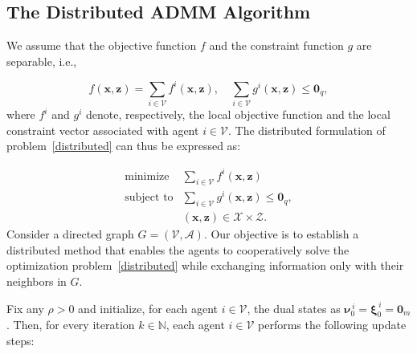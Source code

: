 \documentclass[11pt,a4paper]{article}
\theoremstyle{plain}
\theoremstyle{definition}
\theoremstyle{remark}
\begin{document}
	\subsection{The Distributed ADMM Algorithm}
	
	We assume that the objective function $f $ and the constraint function $g$
	are separable, i.e.,
	
	\begin{equation*}
		f(\boldsymbol{x}, \boldsymbol{z}) = \sum_{i \in \mathcal{V}} f^i(\boldsymbol{x}, \boldsymbol{z}), 
		\quad 
		\sum_{i \in \mathcal{V}} g^i(\boldsymbol{x}, \boldsymbol{z}) \leq \boldsymbol{0}_q,
	\end{equation*}
	where $f^i$ and $g^i$ denote, respectively, the local objective function and the local constraint vector associated with agent $i \in \mathcal{V}$. The distributed formulation of problem~\eqref{distributed} can thus be expressed as:
	
	\begin{equation}
		\begin{array}{ll}
			\text{minimize} & \sum_{i \in \mathcal{V}} f^i(\boldsymbol{x}, \boldsymbol{z}
			) \\ 
			\text{subject to} & \sum_{i \in \mathcal{V}} g^i(\boldsymbol{x}, \boldsymbol{z}) \leq \boldsymbol{0}_q, \\ 
			& (\boldsymbol{x}, \boldsymbol{z}) \in \mathcal{X} \times 
			\mathcal{Z}.%
		\end{array}
		\label{distributed}
	\end{equation}
	Consider a directed graph $G=(\mathcal{V},\mathcal{A})$. Our objective is to
	establish a distributed method that enables the agents to cooperatively solve
	the optimization problem~\eqref{distributed} while exchanging information
	only with their neighbors in $G$. 
	
	Fix any $\rho > 0$ and initialize, for each agent $i \in \mathcal{V}$, the dual states as $\boldsymbol{\nu}^{\,i}_0 = \boldsymbol{\xi}^{\,i}_0 = \boldsymbol{0}_m$. Then, for every iteration $k \in \mathbb{N}$, each agent $i \in \mathcal{V}$ performs the following update steps:
	
\end{document}
